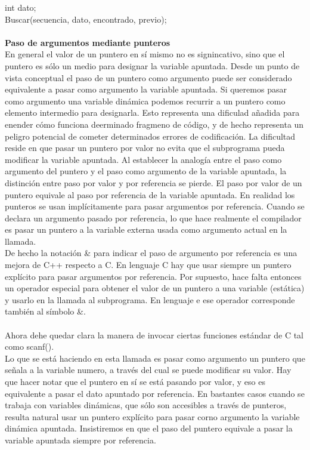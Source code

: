 \documentclass[11pt,a4paper]{article}
\begin{document}
  int dato;\\
  Buscar(secuencia, dato, encontrado, previo);\\
  \\
  \textbf{Paso de argumentos mediante punteros}\\
  En general el valor de un puntero en sí mismo no es signincativo, sino que
  el puntero es sólo un medio para designar la variable apuntada. Desde un
  punto de vista conceptual el paso de un puntero como argumento puede ser
  considerado equivalente a pasar como argumento la variable apuntada. Si queremos pasar como argumento una variable dinámica podemos recurrir a un puntero como elemento intermedio para designarla. Esto representa una dificulad añadida para enender cómo funciona deerminado fragmeno de código, y de hecho representa un peligro potencial de cometer determinados errores de codificación. La dificultad reside en que pasar un puntero por valor no evita que el subprograma pueda modificar la variable apuntada. 
  Al establecer la analogía entre el paso como argumento del puntero
  y el paso como argumento de la variable apuntada, la distinción entre paso
  por valor y por referencia se pierde. El paso por valor de un puntero equivale
  al paso por referencia de la variable apuntada. En realidad los punteros se usan implícitamente para pasar argumentos por
  referencia. Cuando se declara un argumento pasado por referencia, lo que hace
  realmente el compilador es pasar un puntero a la variable externa usada como
  argumento actual en la llamada.\\ De hecho la notación \& para indicar el paso de argumento por referencia es una mejora de C++ respecto a C. En lenguaje C hay que usar siempre un puntero explícito para pasar argumentos por referencia. Por supuesto, hace falta entonces un operador especial para obtener el valor de un puntero a una
  variable (estática) y usarlo en la llamada al subprograma. En lenguaje e ese
  operador corresponde también al símbolo \&.\\
  \\
  Ahora dehe quedar clara la manera de invocar ciertas funciones estándar de C tal como scanf().\\
  Lo que se está haciendo en esta llamada es pasar como argumento un puntero
  que señala a la variable numero, a través del cual se puede modificar su valor.
  Hay que hacer notar que el puntero en sí se está pasando por valor, y eso es
  equivalente a pasar el dato apuntado por referencia. En bastantes casos cuando se trabaja con variables dinámicas, que sólo son
  accesibles a través de punteros, resulta natural usar un puntero explícito para
  pasar corno argumento la variable dinámica apuntada. Insistiremos en que el
  paso del puntero equivale a pasar la variable apuntada siempre por referencia.
\end{document}
